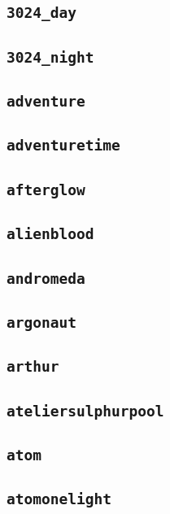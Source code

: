 \subsection{\texttt{3024\_day}}
\newpage
\subsection{\texttt{3024\_night}}
\newpage
\subsection{\texttt{adventure}}
\newpage
\subsection{\texttt{adventuretime}}
\newpage
\subsection{\texttt{afterglow}}
\newpage
\subsection{\texttt{alienblood}}
\newpage
\subsection{\texttt{andromeda}}
\newpage
\subsection{\texttt{argonaut}}
\newpage
\subsection{\texttt{arthur}}
\newpage
\subsection{\texttt{ateliersulphurpool}}
\newpage
\subsection{\texttt{atom}}
\newpage
\subsection{\texttt{atomonelight}}
\newpage
